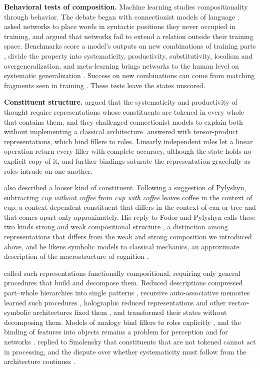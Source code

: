 \documentclass[10pt]{article}
\theoremstyle{plain}
\theoremstyle{remark}
\begin{document}
\textbf{Behavioral tests of composition.} Machine learning studies compositionality through behavior. The debate began with connectionist models of language \citep{rumelhart1986,pinker1988,elman1990}. \citet{hadley1994} asked networks to place words in syntactic positions they never occupied in training, and \citet{marcus1998} argued that networks fail to extend a relation outside their training space. Benchmarks score a model's outputs on new combinations of training parts \citep{lake2018,keysers2020}, \citet{hupkes2020} divide the property into systematicity, productivity, substitutivity, localism and overgeneralization, and meta-learning brings networks to the human level on systematic generalization \citep{lake2023}. Success on new combinations can come from matching fragments seen in training \citep{dziri2023}. These tests leave the states unscored.

\textbf{Constituent structure.} \citet{fodor1988} argued that the systematicity and productivity of thought require representations whose constituents are tokened in every whole that contains them, and they challenged connectionist models to explain both without implementing a classical architecture. \citet{smolensky1990} answered with tensor-product representations, which bind fillers to roles. Linearly independent roles let a linear operation return every filler with complete accuracy, although the state holds no explicit copy of it, and further bindings saturate the representation gracefully as roles intrude on one another.

\citet{smolensky1988} also described a looser kind of constituent. Following a suggestion of Pylyshyn, subtracting \emph{cup without coffee} from \emph{cup with coffee} leaves coffee in the context of cup, a context-dependent constituent that differs in the context of can or tree and that comes apart only approximately. His reply to Fodor and Pylyshyn calls these two kinds strong and weak compositional structure \citep{smolensky1987}, a distinction among representations that differs from the weak and strong composition we introduced above, and he likens symbolic models to classical mechanics, an approximate description of the macrostructure of cognition \citep{smolensky1988}.

\citet{vangelder1990} called such representations functionally compositional, requiring only general procedures that build and decompose them. Reduced descriptions compressed part--whole hierarchies into single patterns \citep{hinton1990}, recursive auto-associative memories learned such procedures \citep{pollack1990}, holographic reduced representations and other vector-symbolic architectures fixed them \citep{plate1995,gayler2006,kanerva2009}, and \citet{chalmers1990} transformed their states without decomposing them. Models of analogy bind fillers to roles explicitly \citep{hummel1997}, and the binding of features into objects remains a problem for perception and for networks \citep{treisman1980,greff2020}. \citet{fodor1990} replied to Smolensky that constituents that are not tokened cannot act in processing, and the dispute over whether systematicity must follow from the architecture continues \citep{goodale2026}.
\end{document}
